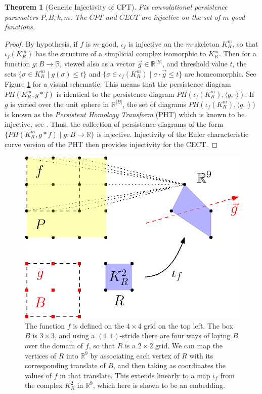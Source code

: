 \documentclass[conference]{IEEEtran}
\newtheorem{theorem}{Theorem}[section]
\theoremstyle{definition}
\numberwithin{figure}{section}
\begin{document}
\begin{theorem}[Generic Injectivity of CPT]
Fix convolutional persistence parameters $P,B,k,m$. The $CPT$ and $CECT$ are injective on the set of $m$-good functions. 
\end{theorem}
\begin{proof}
By hypothesis, if $f$ is $m$-good, $\iota_{f}$ is injective on the $m$-skeleton $K_{R}^m$, so that $\iota_{f}(K_{R}^m)$ has the structure of a simplicial complex isomorphic to $K_{R}^m$. Then for a function $g: B \to \mathbb{R}$, viewed also as a vector $\vec{g} \in \mathbb{R}^{|B|}$, and threshold value $t$, the sets $\{\sigma \in K_{R}^{m} \mid g(\sigma) \leq t\}$ and $\{\sigma \in \iota_{f}(K_{R}^m) \mid \sigma \cdot \vec{g} \leq t \}$ are homeomorphic. See Figure \ref{fig:embedding} for a visual schematic. This means that the persistence diagram $PH(K_{R}^m,g \ast f)$ is identical to the persistence diagram $PH(\iota_{f}(K_{R}^m),\langle g, \cdot \rangle)$. If $g$ is varied over the unit sphere in $\mathbb{R}^{|B|}$, the set of diagrams $PH(\iota_{f}(K_{R}^m),\langle g, \cdot \rangle)$ is known as the \emph{Persistent Homology Transform} (PHT) which is known to be injective, see \cite{turner2014persistent,ghrist2018persistent,curry2018many}. Thus, the collection of persistence diagrams of the form $\{PH(K_{R}^m, g \ast f) \mid g : B \to \mathbb{R}\}$ is injective. Injectivity of the Euler characteristic curve version of the PHT then provides injectivity for the CECT.
\end{proof}

	
\begin{figure}
	\includegraphics{embedding}
	\caption{The function $f$ is defined on the $4 \times 4$ grid on the top left. The box $B$ is $3 \times 3$, and using a $(1,1)$-stride there are four ways of laying $B$ over the domain of $f$, so that $R$ is a $2 \times 2$ grid. We can map the vertices of $R$ into $\mathbb{R}^9$ by associating each vertex of $R$ with its corresponding translate of $B$, and then taking as coordinates the values of $f$ in that translate. This extends linearly to a map $\iota_{f}$ from the complex $K_{R}^2$ in $\mathbb{R}^9$, which here is shown to be an embedding.}
	\label{fig:embedding}
\end{figure}
\end{document}
